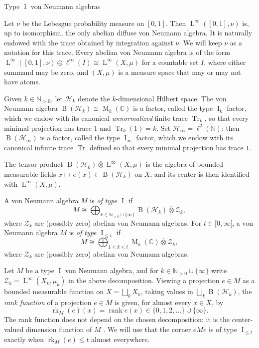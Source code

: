 \documentclass[11pt]{amsart}
\makeatletter
\numberwithin{equation}{section}
\def\subsection{\@startsection{subsection}{2}%
  \z@{.7\linespacing\@plus.7\linespacing}{.3\linespacing}%
  {\normalfont\bfseries}}
\newcommand{\nn}{\mathbb N}
\newcommand{\cc}{\mathbb C}
\renewcommand{\H}{\mathcal H}
\newcommand{\Z}{\mathcal Z}
\newcommand{\ovt}{\mathbin{\overline{\otimes}}}
\DeclareMathOperator{\I}{I}
\DeclareMathOperator{\Tr}{Tr}
\DeclareMathOperator{\rk}{rk}
\DeclareMathOperator{\rank}{rank}
\newcommand{\rB}{\operatorname{B}}
\newcommand{\rL}{\operatorname{L}}
\newcommand{\rM}{\operatorname{M}}
\theoremstyle{definition}
\makeatother
\begin{document}
 

\subsection{Type \texorpdfstring{$\I$}{I} von Neumann algebras}
\label{subsec:prelim-type-i-vna}


Let $\nu$ be the Lebesgue probability measure on $[0,1]$. Then $\rL^\infty([0,1],\nu)$ is, up to isomorphism, the only abelian diffuse von Neumann algebra. It is naturally endowed with the trace obtained by integration against $\nu$. We will keep $\nu$ as a notation for this trace. Every abelian von Neumann algebra is of the form $\rL^\infty([0,1],\nu)\oplus\ell^\infty(I)\cong \rL^{\infty}(X,\mu)$ for a countable set $I$, where either summand may be zero, and $(X,\mu)$ is a measure space that may or may not have atoms.

Given $k\in\nn_{>0}$, let $\H_k$ denote the $k$-dimensional Hilbert space. The von Neumann algebra $\rB(\H_k)\cong\rM_k(\cc)$ is a factor, called the type $\I_k$ factor, which we endow with its canonical \emph{unnormalized} finite trace $\Tr_k$, so that every minimal projection has trace $1$ and $\Tr_k(1)=k$. Set $\H_{\infty}=\ell^2(\nn)$: then $\rB(\H_{\infty})$ is a factor, called the type $\I_{\infty}$ factor, which we endow with its canonical infinite trace $\Tr$ defined so that every minimal projection has trace $1$. 

The tensor product $\rB(\H_k)\ovt\rL^{\infty}(X,\mu)$ is the algebra of bounded measurable fields $x\mapsto e(x)\in\rB(\H_k)$ on $X$, and its center is then identified with $\rL^\infty(X,\mu)$.

A von Neumann algebra $M$ is \emph{of type $\I$} if 
$$
    M\cong\bigoplus_{k\in\nn_{>0}\cup\{\infty\}}\rB(\H_k)\ovt\Z_k,
$$
where $\Z_k$ are (possibly zero) abelian von Neumann algebras. 
For $t\in[0,\infty[$, a von Neumann algebra $M$ is \emph{of type $\I_{\leq t}$} if
$$
    M\cong\bigoplus_{1\leq k\leq t}\rM_k(\cc)\ovt\Z_k,
$$
where $\Z_k$ are (possibly zero) abelian von Neumann algebras.

Let $M$ be a type $\I$ von Neumann algebra, and for $k\in \nn_{>0}\cup\{\infty\}$ write $\Z_k=\rL^\infty(X_k,\mu_k)$ in the above decomposition. Viewing a projection $e\in M$ as a bounded measurable function on $X=\bigsqcup_k X_k$, taking values in $\bigsqcup_k \rB(\H_k)$, the \emph{rank function} of a projection $e\in M$ is given, for almost every $x\in X$, by
$$
    \rk_M(e)(x)=\rank e(x)\in\{0,1,2,\ldots\}\cup\{\infty\}.
$$
The rank function does not depend on the chosen decomposition: it is the center-valued dimension function of $M$ \cite[Definition~V.2.33 and Theorem~V.2.34]{Ta79}. 
We will use that the corner $eMe$ is of type $\I_{\leq t}$ exactly when $\rk_M(e)\leq t$ almost everywhere.
\end{document}
